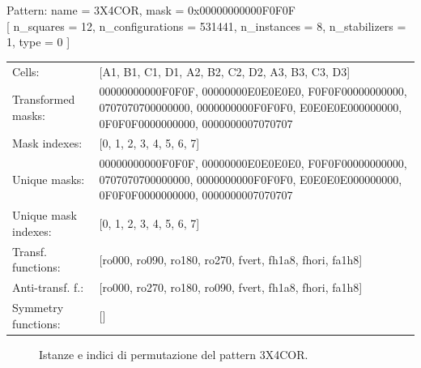 \begin{tcolorbox}[sharp corners, fontupper=\ttfamily\small, colback=white]
  \noindent Pattern: name = 3X4COR, mask = 0x00000000000F0F0F\\
  {[} n\_squares = 12, n\_configurations = 531441,
  n\_instances = 8, n\_stabilizers = 1, type = 0 { ]}\\[1.0ex]
  \begin{tabularx}{\textwidth}{@{} p{3.5cm} X @{}}
    Cells:               & {[}A1, B1, C1, D1, A2, B2, C2, D2, A3, B3, C3, D3{]}\\[0.5ex]
    Transformed masks:   & 00000000000F0F0F, 00000000E0E0E0E0, F0F0F00000000000, 0707070700000000, 0000000000F0F0F0, E0E0E0E000000000, 0F0F0F0000000000, 0000000007070707\\[0.5ex]
    Mask indexes:        & {[}0, 1, 2, 3, 4, 5, 6, 7{]}\\[0.5ex]
    Unique masks:        & 00000000000F0F0F, 00000000E0E0E0E0, F0F0F00000000000, 0707070700000000, 0000000000F0F0F0, E0E0E0E000000000, 0F0F0F0000000000, 0000000007070707\\[0.5ex]
    Unique mask indexes: & {[}0, 1, 2, 3, 4, 5, 6, 7{]}\\[0.5ex]
    Transf. functions:   & {[}ro000, ro090, ro180, ro270, fvert, fh1a8, fhori, fa1h8{]}\\[0.5ex]
    Anti-transf. f.:     & {[}ro000, ro270, ro180, ro090, fvert, fh1a8, fhori, fa1h8{]}\\[0.5ex]
    Symmetry functions:  & {[}{]}\\[0.5ex]
  \end{tabularx}
\end{tcolorbox}

\begin{figure}[htbp]
  \centering
   \hfill
   \hfill
   \hfill
  \vspace{0.3cm}
   \hfill
   \hfill
   \hfill
  \caption{Istanze e indici di permutazione del pattern 3X4COR.}
\end{figure}

